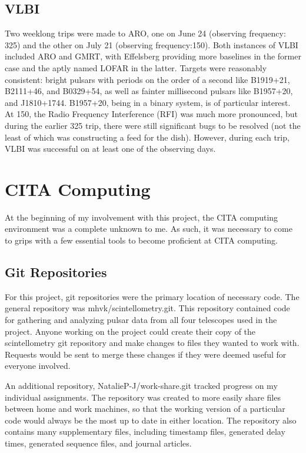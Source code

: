 \documentclass[a4paper,12pt]{article}
\begin{document}
\subsection{VLBI}
\label{vlbi}

Two weeklong trips were made to ARO, one on June 24 (observing frequency: \unit{325}{\mega\hertz}) and the other on July 21 (observing frequency:\unit{150}{\mega\hertz}). Both instances of VLBI included ARO and GMRT, with Effelsberg providing more baselines in the former case and the aptly named LOFAR in the latter. Targets were reasonably consistent: bright pulsars with periods on the order of a second like B1919+21, B2111+46, and B0329+54, as well as fainter millisecond pulsars like B1957+20, and J1810+1744. B1957+20, being in a binary system\citep{millisecondpulsar}, is of particular interest. At \unit{150}{\mega\hertz}, the Radio Frequency Interference (RFI) was much more pronounced, but during the earlier \unit{325}{\mega\hertz} trip, there were still significant bugs to be resolved (not the least of which was constructing a feed for the dish). However, during each trip, VLBI was successful on at least one of the observing days.

\section{CITA Computing}
\label{sec:CITAcomputing}

At the beginning of my involvement with this project, the CITA computing environment was a complete unknown to me. As such, it was necessary to come to grips with a few essential tools to become proficient at CITA computing.

\subsection{Git Repositories}
\label{sec:git}

For this project, git repositories were the primary location of necessary code. The general repository was mhvk/scintellometry.git. This repository contained code for gathering and analyzing pulsar data from all four telescopes used in the project. Anyone working on the project could create their copy of the scintellometry git repository and make changes to files they wanted to work with. Requests would be sent to merge these changes if they were deemed useful for everyone involved.

An additional repository, NatalieP-J/work-share.git tracked progress on my individual assignments. The repository was created to more easily share files between home and work machines, so that the working version of a particular code would always be the most up to date in either location. The repository also contains many supplementary files, including timestamp files, generated delay times, generated sequence files, and journal articles.
\end{document}
